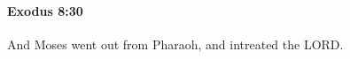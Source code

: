 
		\paragraph{Exodus 8:30} %
			\label{EXODUS-8-30}

			And Moses went out from Pharaoh, and intreated the LORD.


